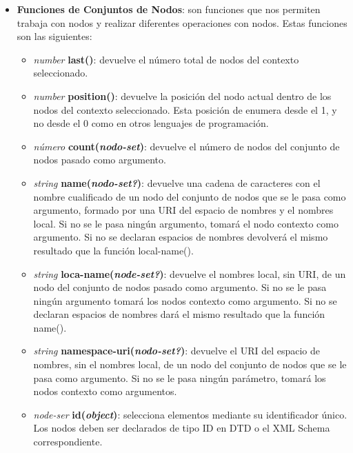 \begin{itemize}
    \item \textbf{Funciones de Conjuntos de Nodos}: son funciones que nos permiten trabaja con nodos y realizar diferentes operaciones con nodos. Estas funciones son las siguientes:

    \begin{itemize}
        \item \textit{number} \textbf{last()}: devuelve el número total de nodos del contexto seleccionado.
        \item \textit{number} \textbf{position()}: devuelve la posición del nodo actual dentro de los nodos del contexto seleccionado. Esta posición de enumera desde el 1, y no desde el 0 como en otros lenguajes de programación.
        \item \textit{número} \textbf{count(\textit{nodo-set})}: devuelve el número de nodos del conjunto de nodos pasado como argumento.
        \item \textit{string} \textbf{name(\textit{nodo-set?})}: devuelve una cadena de caracteres con el nombre cualificado de un nodo del conjunto de nodos que se le pasa como argumento, formado por una URI del espacio de nombres y el nombres local. Si no se le pasa ningún argumento, tomará el nodo contexto como argumento. Si no se declaran espacios de nombres devolverá el mismo resultado que la función local-name().
        \item \textit{string} \textbf{loca-name(\textit{node-set?})}: devuelve el nombres local, sin URI, de un nodo del conjunto de nodos pasado como argumento. Si no se le pasa ningún argumento tomará los nodos contexto como argumento. Si no se declaran espacios de nombres dará el mismo resultado que la función name().
        \item \textit{string} \textbf{namespace-uri(\textit{nodo-set?})}: devuelve el URI del espacio de nombres, sin el nombres local, de un nodo del conjunto de nodos que se le pasa como argumento. Si no se le pasa ningún parámetro, tomará los nodos contexto como argumentos.
        \item \textit{node-ser} \textbf{id(\textit{object})}: selecciona elementos mediante su identificador único. Los nodos deben ser declarados de tipo ID en DTD o el XML Schema correspondiente.
    \end{itemize}


\end{itemize}

